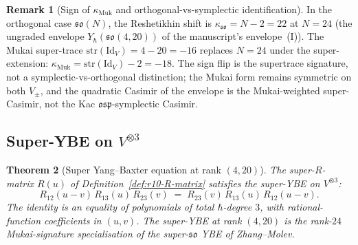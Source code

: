 \documentclass{article}
\providecommand{\fso}{\mathfrak{so}}
\providecommand{\fosp}{\mathfrak{osp}}
\providecommand{\Id}{\mathrm{Id}}
\providecommand{\str}{\mathrm{str}}
\newtheorem{theorem}{Theorem}
\theoremstyle{definition}
\newtheorem{remark}[theorem]{Remark}
\begin{document}
\begin{remark}[Sign of $\kappa_{\mathrm{Muk}}$ and orthogonal-vs-symplectic
identification]
\label{rem:r10-kappa-sign}
In the orthogonal case $\fso(N)$, the Reshetikhin shift is
$\kappa_{\fso} = N - 2 = 22$ at $N = 24$ (the ungraded envelope
$Y_\hbar(\fso(4, 20))$ of the manuscript's envelope~(I)). The Mukai
super-trace $\str(\Id_V) = 4 - 20 = -16$ replaces $N = 24$ under
the super-extension: $\kappa_{\mathrm{Muk}} = \str(\Id_V) - 2 = -18$.
The sign flip is the supertrace signature, not a symplectic-vs-orthogonal
distinction; the Mukai form remains symmetric on both $V_\pm$, and
the quadratic Casimir of the envelope is the Mukai-weighted
super-Casimir, not the Kac $\fosp$-symplectic Casimir.
\end{remark}

\subsection{Super-YBE on $V^{\otimes 3}$}

\begin{theorem}[Super Yang--Baxter equation at rank $(4, 20)$]
\label{thm:r10-super-YBE}
The super-$R$-matrix $R(u)$ of
Definition~\ref{def:r10-R-matrix} satisfies the super-YBE on
$V^{\otimes 3}$:
\begin{equation}\label{eq:r10-super-YBE}
  R_{12}(u - v)\, R_{13}(u)\, R_{23}(v)
  \;=\;
  R_{23}(v)\, R_{13}(u)\, R_{12}(u - v).
\end{equation}
The identity is an equality of polynomials of total $\hbar$-degree
$3$, with rational-function coefficients in $(u, v)$. The super-YBE
at rank $(4, 20)$ is the rank-$24$ Mukai-signature specialisation of
the super-$\fso$ YBE of Zhang--Molev.
\end{theorem}
\end{document}
